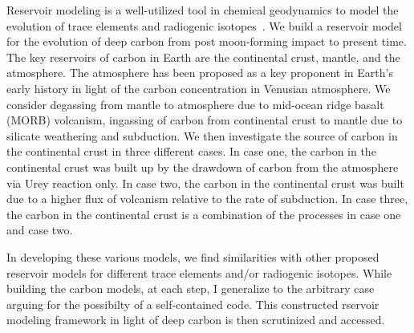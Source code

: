 Reservoir modeling is a well-utilized tool in chemical geodynamics to model the evolution of trace elements and radiogenic isotopes~\cite{ACJ-BO-DB:1980, KLH-WGJ:1990, SNH-ZK:2001}. We build a reservoir model for the evolution of deep carbon from post moon-forming impact to present time. The key reservoirs of carbon in Earth are the continental crust, mantle, and the atmosphere. The atmosphere has been proposed as a key proponent in Earth's early history in light of the carbon concentration in Venusian atmosphere. We consider degassing from mantle to atmosphere due to mid-ocean ridge basalt (MORB) volcanism, ingassing of carbon from continental crust to mantle due to silicate weathering and subduction. We then investigate the source of carbon in the continental crust in three different cases. In case one, the carbon in the continental crust was built up by the drawdown of carbon from the atmosphere via Urey reaction only. In case two, the carbon in the continental crust was built due to a higher flux of volcanism relative to the rate of subduction. In case three, the carbon in the continental crust is a combination of the processes in case one and case two.

In developing these various models, we find similarities with other proposed reservoir models for different trace elements and/or radiogenic isotopes. While building the carbon models, at each step, I generalize to the arbitrary case arguing for the possibilty of a self-contained code. This constructed rservoir modeling framework in light of deep carbon is then scrutinized and accessed.